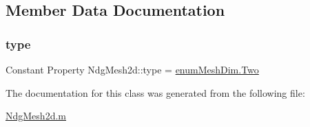 \subsection{Member Data Documentation}
\mbox{\label{class_ndg_mesh2d_a48b5c79f0e0f040c8c425bfa26fe515c}} 
\subsubsection{\texorpdfstring{type}{type}}
{\footnotesize\ttfamily Constant Property Ndg\+Mesh2d\+::type = \hyperlink{classenum_mesh_dim_a5a67c42a0c79eab8e32b9c613507a672af027c134a34d29d25d620ecb88abf423}{enum\+Mesh\+Dim.\+Two}}



The documentation for this class was generated from the following file\+:\begin{DoxyCompactItemize}
\item 
\hyperlink{_ndg_mesh2d_8m}{Ndg\+Mesh2d.\+m}\end{DoxyCompactItemize}
